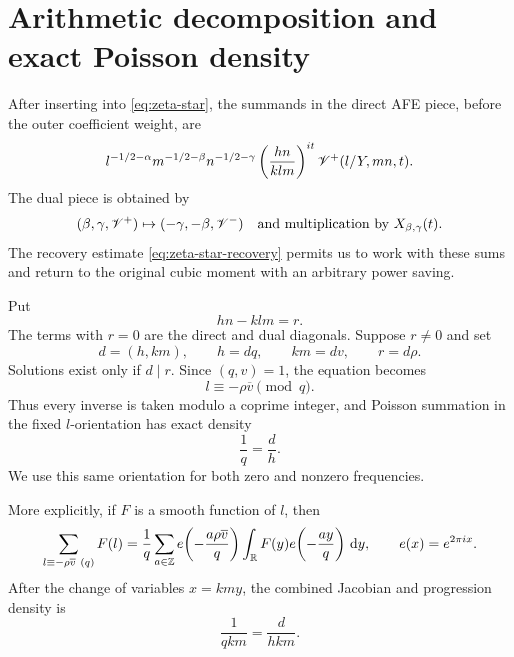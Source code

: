 \section{Arithmetic decomposition and exact Poisson density}
\label{sec:poisson}

After inserting  into \eqref{eq:zeta-star}, the summands in the
direct AFE piece, before the outer coefficient weight, are
\begin{equation}\label{eq:direct-summand}
 l^{-1/2-\alpha}m^{-1/2-\beta}n^{-1/2-\gamma}
 \left(\frac{hn}{klm}\right)^{it}
 \mathscr V^+(l/Y,mn,t).
\end{equation}
The dual piece is obtained by
\begin{equation}\label{eq:dual-substitution}
 (\beta,\gamma,\mathscr V^+)\mapsto(-\gamma,-\beta,\mathscr V^-)
 \quad\text{and multiplication by }X_{\beta,\gamma}(t).
\end{equation}
The recovery estimate \eqref{eq:zeta-star-recovery} permits us to work with
these sums and return to the original cubic moment with an arbitrary power
saving.

Put
\begin{equation}\label{eq:r-equation}
                         hn-klm=r.
\end{equation}
The terms with $r=0$ are the direct and dual diagonals.  Suppose $r\neq0$ and
set
\begin{equation}\label{eq:gcd-decomposition}
 d=(h,km),\qquad h=dq,\qquad km=dv,\qquad r=d\rho.
\end{equation}
Solutions exist only if $d\mid r$.  Since $(q,v)=1$, the equation becomes
\begin{equation}\label{eq:l-congruence}
                       l\equiv-\rho\overline v\pmod q.
\end{equation}
Thus every inverse is taken modulo a coprime integer, and Poisson summation in
the fixed $l$-orientation has exact density
\begin{equation}\label{eq:poisson-density}
                             \frac1q=\frac dh.
\end{equation}
We use this same orientation for both zero and nonzero frequencies.

More explicitly, if $F$ is a smooth function of $l$, then
\begin{equation}\label{eq:poisson-formula}
 \sum_{l\equiv-\rho\overline v\ (q)}F(l)
 =\frac1q\sum_{a\in\mathbb Z}
 e\!\left(-\frac{a\rho\overline v}{q}\right)
 \int_{\mathbb R}F(y)e\!\left(-\frac{ay}{q}\right)\,\mathrm d y,
 \qquad e(x)=e^{2\pi ix}.
\end{equation}
After the change of variables $x=kmy$, the combined Jacobian and progression
density is
\begin{equation}\label{eq:poisson-jacobian}
                           \frac{1}{qkm}=\frac{d}{hkm}.
\end{equation}


